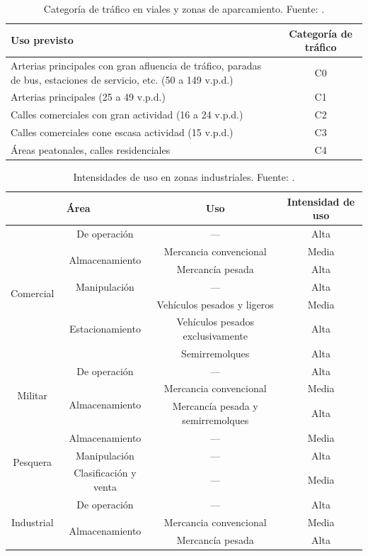 \begin{table}[!htb]
\centering
\begin{tabular}{p{7cm}c}
\toprule
Uso previsto & Categoría de tráfico\\
\midrule
Arterias principales con gran afluencia de tráfico, paradas de bus, estaciones de servicio, etc. (50 a 149 v.p.d.) & C0\\
Arterias principales (25 a 49 v.p.d.) & C1\\
Calles comerciales con gran actividad (16 a 24 v.p.d.) & C2\\
Calles comerciales cone escasa actividad (15 v.p.d.) & C3\\
Áreas peatonales, calles residenciales & C4\\
\bottomrule
\end{tabular}
\caption[Categoría de tráfico en viales y zonas de aparcamiento.]{Categoría de tráfico en viales y zonas de aparcamiento. Fuente: \protect\cite{euroadoquinc}.}
\label{categoriadetraficoenviales}
\end{table}

\begin{table}[!htb]
\centering
\begin{tabular}{cccc}
\toprule
\multicolumn{2}{c}{Área} & Uso & Intensidad de uso\\
\midrule
\multirow{7}{*}{Comercial} & De operación & — & Alta\\
& \multirow{2}{*}{Almacenamiento} & Mercancia convencional & Media\\
& & Mercancía pesada & Alta\\
& Manipulación & — & Alta\\
& \multirow{3}{*}{Estacionamiento} & Vehículos pesados y ligeros & Media\\
& & Vehículos pesados exclusivamente & Alta\\
& & Semirremolques & Alta\\
\midrule
\multirow{3}{*}{Militar} & De operación & — & Alta\\
& \multirow{2}{*}{Almacenamiento} & Mercancia convencional & Media\\
& & Mercancía pesada y semirremolques & Alta\\
\midrule
\multirow{3}{*}{Pesquera} & Almacenamiento & — & Media\\
& Manipulación & — & Alta\\
& Clasificación y venta & — & Media\\
\midrule
\multirow{3}{*}{Industrial} & De operación & — & Alta\\
& \multirow{2}{*}{Almacenamiento} & Mercancia convencional & Media\\
& & Mercancía pesada & Alta\\
\bottomrule
\end{tabular}
\caption[Intensidades de uso en zonas industriales.]{Intensidades de uso en zonas industriales. Fuente: \protect\cite{euroadoquinc}.}
\label{categoriadetraficoenzonasindustrialesintensidades}
\end{table}

